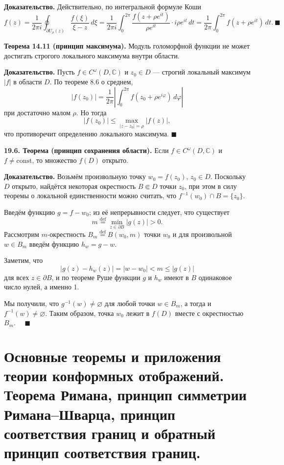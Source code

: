 \documentclass[12pt, a4paper]{article}
\theoremstyle{definition}
\theoremstyle{remark}
\begin{document}
\textbf{Доказательство.} Действительно, по интегральной формуле Коши
$$f(z) = \frac{1}{2\pi i} \oint_{\partial U_\rho(z)} \frac{f(\xi)}{\xi - z} \, d\xi = \frac{1}{2\pi i} \int_{0}^{2\pi} \frac{f(z + \rho e^{it})}{\rho e^{it}} \cdot i\rho e^{it} \, dt = \frac{1}{2\pi} \int_{0}^{2\pi} f(z + \rho e^{it}) \, dt. \ \blacksquare$$

\textbf{Теорема 14.11 (принцип максимума).} Модуль голоморфной функции не может достигать строгого локального максимума внутри области.

\textbf{Доказательство.} Пусть $f \in C^\omega(D, \mathbb{C})$ и $z_0 \in D$ --- строгий локальный максимум $|f|$ в области $D$. По теореме 8.6 о среднем,
$$|f(z_0)| = \frac{1}{2\pi} \left| \int_{0}^{2\pi} f(z_0 + \rho e^{i\varphi}) \, d\varphi \right|$$
при достаточно малом $\rho$. Но тогда
$$|f(z_0)| \le \max_{|z - z_0| = \rho} |f(z)|,$$
что противоречит определению локального максимума. $\blacksquare$

\textbf{19.6. Теорема (принцип сохранения области).} Если $f \in C^{\omega}(D,\mathbb{C})$ и $f \neq \text{const}$, то множество $f(D)$ открыто.

\textbf{Доказательство.} Возьмём произвольную точку $w_0 = f(z_0)$, $z_0 \in D$. Поскольку $D$ открыто, найдётся некоторая окрестность $B \Subset D$ точки $z_0$, при этом в силу теоремы о локальной единственности можно считать, что $f^{-1}(w_0) \cap B = \{z_0\}$.

Введём функцию $g = f - w_0$; из её непрерывности следует, что существует
\[
m \stackrel{\text{def}}{=} \min_{z \in \partial B} |g(z)| > 0.
\]
Рассмотрим $m$-окрестность $B_m \stackrel{\text{def}}{=} B(w_0, m)$ точки $w_0$ и для произвольной $w \in B_m$ введём функцию $h_w = g - w$.

Заметим, что
\[
|g(z) - h_w(z)| = |w - w_0| < m \le |g(z)|
\]
для всех $z \in \partial B$, и по теореме Руше функции $g$ и $h_w$ имеют в $B$ одинаковое число нулей, а именно 1.

Мы получили, что $g^{-1}(w) \neq \varnothing$ для любой точки $w \in B_m$, а тогда и $f^{-1}(w) \neq \varnothing$. Таким образом, точка $w_0$ лежит в $f(D)$ вместе с окрестностью $B_m$. $\quad \blacksquare$

\newpage
\section{Основные теоремы и приложения теории конформных отображений. Теорема Римана, принцип симметрии Римана–Шварца, принцип соответствия границ и обратный принцип соответствия границ.}
\end{document}
